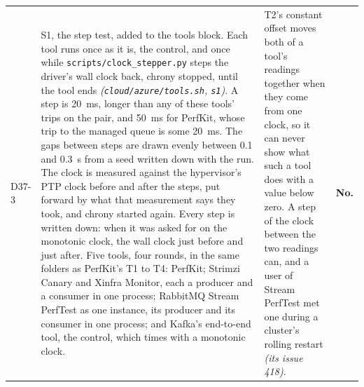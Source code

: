 \documentclass[11pt]{article}
\newcommand{\gl}[1]{{\color{soft}\itshape\small (#1)}}
\begin{document}
{\begin{longtable}{@{}p{1.1cm} >{\raggedright\arraybackslash}p{6.1cm} >{\raggedright\arraybackslash}p{6.0cm} >{\raggedright\arraybackslash}p{2.2cm}@{}}
D37-3 & S1, the step test, added to the tools block. Each tool runs once as it is, the control, and once while \texttt{scripts/clock\_stepper.py} steps the driver's wall clock back, chrony stopped, until the tool ends \gl{\texttt{cloud/azure/tools.sh}, \texttt{s1}}. A step is 20~ms, longer than any of these tools' trips on the pair, and 50~ms for PerfKit, whose trip to the managed queue is some 20~ms. The gaps between steps are drawn evenly between 0.1 and 0.3~s from a seed written down with the run. The clock is measured against the hypervisor's PTP clock before and after the steps, put forward by what that measurement says they took, and chrony started again. Every step is written down: when it was asked for on the monotonic clock, the wall clock just before and just after. Five tools, four rounds, in the same folders as PerfKit's T1 to T4: PerfKit; Strimzi Canary and Xinfra Monitor, each a producer and a consumer in one process; RabbitMQ Stream PerfTest as one instance, its producer and its consumer in one process; and Kafka's end-to-end tool, the control, which times with a monotonic clock. & T2's constant offset moves both of a tool's readings together when they come from one clock, so it can never show what such a tool does with a value below zero. A step of the clock between the two readings can, and a user of Stream PerfTest met one during a cluster's rolling restart \gl{its issue 418}. & \textbf{No.} \\

\end{longtable}}
\end{document}
